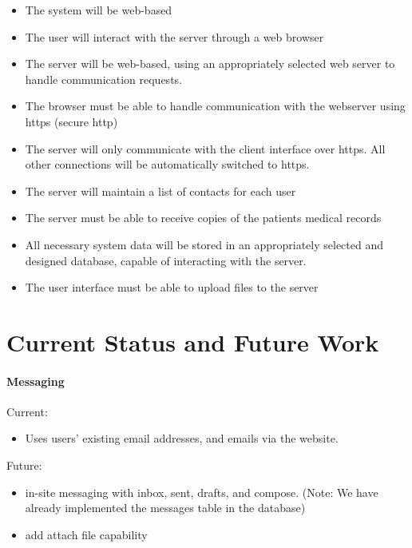 \begin{itemize}
\item The system will be web-based
\item The user will interact with the server through a web browser
\item The server will be web-based, using an appropriately selected web server to handle communication requests.
\item The browser must be able to handle communication with the webserver using https (secure http)
\item The server will only communicate with the client interface over https.  All other connections will be automatically switched to https.
\item The server will maintain a list of contacts for each user
\item The server must be able to receive copies of the patients medical records
\item All necessary system data will be stored in an appropriately selected and designed database, capable of interacting with the server.
\item The user interface must be able to upload files to the server
\end{itemize}

\chapter{Current Status and Future Work}

\subsubsection{Messaging}
Current: 
\begin{itemize}
\item Uses users' existing email addresses, and emails via the website. 
\end{itemize}
Future: 
\begin{itemize}
\item in-site messaging with inbox, sent, drafts, and compose. (Note: We have already implemented the messages table in the database)
\item add attach file capability
\end{itemize}


